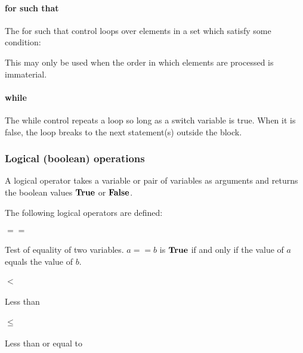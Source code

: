 \begin{pseudo*}
\bsEND
\end{pseudo*}

\paragraph*{for such that} The for such that control loops over elements in
a set which satisfy some condition:

\begin{pseudo*}
\bsEND
\end{pseudo*}

This may only be used when the order in which elements are processed is 
immaterial.

\paragraph*{while}

The while control repeats a loop so long as a switch variable is true. 
When it is false, the loop breaks to the next statement(s) outside the block.

\begin{pseudo*}
\bsEND
{}
\end{pseudo*}

\subsubsection{Logical (boolean) operations}
\label{booleanops}

A logical operator takes a variable or pair of variables as arguments and
returns the boolean values $\text{\bf{True}}$ or $\text{\bf{False}}$.

The following logical operators are defined:

\paragraph*{$==$} Test of equality of two variables. $a==b$ is $\text{\bf{True}}$ if and
only if the value of $a$ equals the value of $b$. 

\paragraph*{$<$}	Less than

\paragraph*{$\leq$} Less than or equal to

